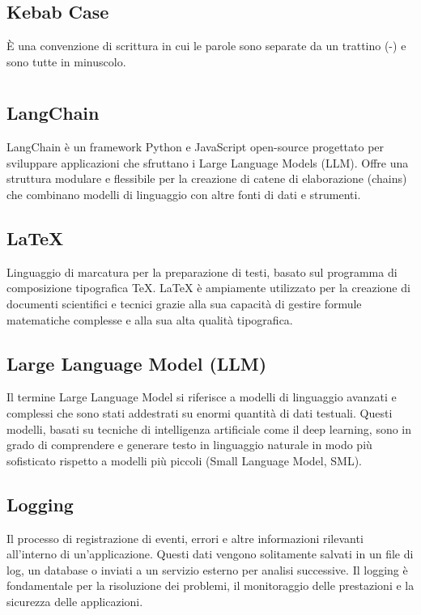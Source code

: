 
\section{}

\hypertarget{sec:Kebab Case}{}
\subsection*{Kebab Case}
È una convenzione di scrittura in cui le parole sono separate da un trattino (-) e sono tutte in minuscolo.

\newpage



\section{}

\hypertarget{sec:langchain}{}
\subsection*{LangChain}
LangChain è un framework Python e JavaScript open-source progettato per sviluppare applicazioni che sfruttano i Large Language Models 
(LLM). Offre una struttura modulare e flessibile per la creazione di catene di elaborazione (chains) che combinano modelli di 
linguaggio con altre fonti di dati e strumenti.

\subsection*{\LaTeX}
Linguaggio di marcatura per la preparazione di testi, basato sul programma di composizione tipografica TeX. LaTeX è ampiamente utilizzato per la creazione 
di documenti scientifici e tecnici grazie alla sua capacità di gestire formule matematiche complesse e alla sua alta qualità tipografica.

\hypertarget{sec:LLM}{}
\subsection*{Large Language Model (LLM)}
Il termine Large Language Model si riferisce a modelli di linguaggio avanzati e complessi che sono stati addestrati su enormi quantità di dati testuali. 
Questi modelli, basati su tecniche di intelligenza artificiale come il deep learning, sono in grado di comprendere e generare testo in linguaggio naturale 
in modo più sofisticato rispetto a modelli più piccoli (Small Language Model, SML).

\hypertarget{sec:logging}{}
\subsection*{Logging}
Il processo di registrazione di eventi, errori e altre informazioni rilevanti all'interno di un'applicazione. Questi dati vengono 
solitamente salvati in un file di log, un database o inviati a un servizio esterno per analisi successive. Il logging è fondamentale 
per la risoluzione dei problemi, il monitoraggio delle prestazioni e la sicurezza delle applicazioni.

\newpage